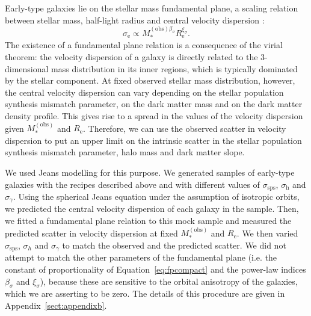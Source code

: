 \documentclass{aa}
\def\reff{R_{\mathrm{e}}}
\def\mstar{M_*}
\def\mobs{M_*^{(\mathrm{obs})}}
\def\Eref#1{Equation~\ref{#1}\xspace}
\begin{document}
Early-type galaxies lie on the stellar mass fundamental plane, a scaling relation between stellar mass, half-light radius and central velocity dispersion \citep{H+B09}:
\begin{equation}\label{eq:fpcompact}
\sigma_{\mathrm{e}} \propto \mstar^{(\mathrm{obs})\beta_{\sigma}}\reff^{\xi_{\sigma}}.
\end{equation}
The existence of a fundamental plane relation is a consequence of the virial theorem: the velocity dispersion of a galaxy is directly related to the 3-dimensional mass distribution in its inner regions, which is typically dominated by the stellar component.
At fixed observed stellar mass distribution, however, the central velocity dispersion can vary depending on the stellar population synthesis mismatch parameter, on the dark matter mass and on the dark matter density profile. This gives rise to a spread in the values of the velocity dispersion given $\mobs$ and $\reff$.
Therefore, we can use the observed scatter in velocity dispersion to put an upper limit on the intrinsic scatter in the stellar population synthesis mismatch parameter, halo mass and dark matter slope.

We used Jeans modelling for this purpose.
We generated samples of early-type galaxies with the recipes described above and with different values of $\sigma_{\mathrm{sps}}$, $\sigma_\mathrm{h}$ and $\sigma_\gamma$.
Using the spherical Jeans equation under the assumption of isotropic orbits, we predicted the central velocity dispersion of each galaxy in the sample. Then, we fitted a fundamental plane relation to this mock sample and measured the predicted scatter in velocity dispersion at fixed $\mobs$ and $\reff$.
We then varied $\sigma_{\mathrm{sps}}$, $\sigma_h$ and $\sigma_\gamma$ to match the observed and the predicted scatter.
We did not attempt to match the other parameters of the fundamental plane (i.e. the constant of proportionality of \Eref{eq:fpcompact} and the power-law indices $\beta_{\sigma}$ and $\xi_{\sigma}$), because these are sensitive to the orbital anisotropy of the galaxies, which we are asserting to be zero.
The details of this procedure are given in Appendix~\ref{sect:appendixb}.
\end{document}
